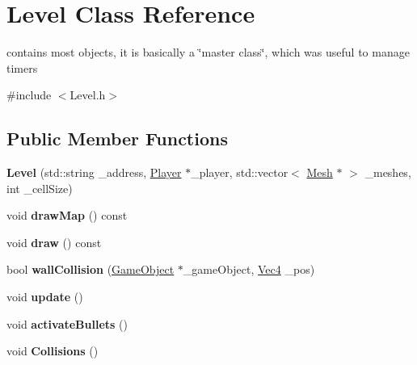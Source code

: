 \hypertarget{classLevel}{}\section{Level Class Reference}
\label{classLevel}


contains most objects, it is basically a \char`\"{}master class\char`\"{}, which was useful to manage timers  




{\ttfamily \#include $<$Level.\+h$>$}

\subsection*{Public Member Functions}
\begin{DoxyCompactItemize}
\item 
{\bfseries Level} (std\+::string \+\_\+address, \hyperlink{classPlayer}{Player} $\ast$\+\_\+player, std\+::vector$<$ \hyperlink{classMesh}{Mesh} $\ast$ $>$ \+\_\+meshes, int \+\_\+cell\+Size)\hypertarget{classLevel_ad43f3f39d70bce7065f5bbd299b43d74}{}\label{classLevel_ad43f3f39d70bce7065f5bbd299b43d74}

\item 
void {\bfseries draw\+Map} () const \hypertarget{classLevel_a522a8acb3610c8e02b3063b098ea6c9a}{}\label{classLevel_a522a8acb3610c8e02b3063b098ea6c9a}

\item 
void {\bfseries draw} () const \hypertarget{classLevel_ae7de8e9ecd7d33a6b891bf58f3a71951}{}\label{classLevel_ae7de8e9ecd7d33a6b891bf58f3a71951}

\item 
bool {\bfseries wall\+Collision} (\hyperlink{classGameObject}{Game\+Object} $\ast$\+\_\+game\+Object, \hyperlink{classVec4}{Vec4} \+\_\+pos)\hypertarget{classLevel_a6b93a8960e619d24e0a76d877be1f36e}{}\label{classLevel_a6b93a8960e619d24e0a76d877be1f36e}

\item 
void {\bfseries update} ()\hypertarget{classLevel_a62e412eaad753d2baa2f94239cb80e41}{}\label{classLevel_a62e412eaad753d2baa2f94239cb80e41}

\item 
void {\bfseries activate\+Bullets} ()\hypertarget{classLevel_a3a0dd3f0d9936cbb44b2de0283b94200}{}\label{classLevel_a3a0dd3f0d9936cbb44b2de0283b94200}

\item 
void {\bfseries Collisions} ()\hypertarget{classLevel_ab9335b7276b912dce033d4b57e56f5c9}{}\label{classLevel_ab9335b7276b912dce033d4b57e56f5c9}


\end{DoxyCompactItemize}
